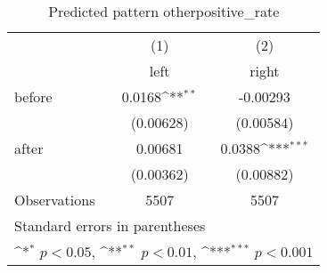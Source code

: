 \begin{table}[htbp]\centering
\def\sym#1{\ifmmode^{#1}\else\(^{#1}\)\fi}
\caption{Predicted pattern otherpositive\_rate}
\begin{tabular}{l*{2}{c}}
\hline\hline
                    &\multicolumn{1}{c}{(1)}&\multicolumn{1}{c}{(2)}\\
                    &\multicolumn{1}{c}{left}&\multicolumn{1}{c}{right}\\
\hline
before              &      0.0168\sym{**} &    -0.00293         \\
                    &   (0.00628)         &   (0.00584)         \\
[1em]
after               &     0.00681         &      0.0388\sym{***}\\
                    &   (0.00362)         &   (0.00882)         \\
\hline
Observations        &        5507         &        5507         \\
\hline\hline
\multicolumn{3}{l}{\footnotesize Standard errors in parentheses}\\
\multicolumn{3}{l}{\footnotesize \sym{*} \(p<0.05\), \sym{**} \(p<0.01\), \sym{***} \(p<0.001\)}\\
\end{tabular}
\end{table}
